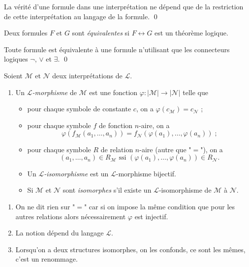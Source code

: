 \documentclass[./main]{subfiles}
\begin{document}
  \begin{crlr}
    La vérité d'une formule dans une interprétation ne dépend que de la restriction de cette interprétation au langage de la formule.
    \qed
  \end{crlr}

  \begin{defn}
    Deux formules $F$ et $G$ sont \textit{équivalentes} si $F \leftrightarrow G$ est un théorème logique.
  \end{defn}

  \begin{prop}
    Toute formule est équivalente à une formule n'utilisant que les connecteurs logiques $\lnot$, $\lor$ et $\exists$.
    \qed
  \end{prop}


  \begin{defn}
    Soient $\mathcal{M}$ et $\mathcal{N}$ deux interprétations de $\mathcal{L}$.
    \begin{enumerate}
      \item Un \textit{$\mathcal{L}$-morphisme} de $\mathcal{M}$ est une fonction $\varphi : |\mathcal{M}| \to |\mathcal{N}|$ telle que 
        \begin{itemize}
          \item pour chaque symbole de constante $c$, on a $\varphi(c_\mathcal{M}) = c_\mathcal{N}$ ;
          \item pour chaque symbole $f$ de fonction $n$-aire, on a 
            \[
            \varphi(f_\mathcal{M}(a_1, \ldots, a_n)) = f_\mathcal{N}(\varphi(a_1), \ldots, \varphi(a_n))\;
            ;\] 
          \item pour chaque symbole $R$ de relation $n$-aire (autre que "$=$"), on a 
            \[
              (a_1, \ldots, a_n) \in R_\mathcal{M} \text{ ssi } (\varphi(a_1), \ldots, \varphi(a_n)) \in R_\mathcal{N}
            .\]
          \item Un \textit{$\mathcal{L}$-isomorphisme} est un $\mathcal{L}$-morphisme bijectif.
          \item Si $\mathcal{M}$ et $\mathcal{N}$ sont \textit{isomorphes} s'il existe un $\mathcal{L}$-isomorphisme de $\mathcal{M}$ à $\mathcal{N}$.
        \end{itemize}
    \end{enumerate}
  \end{defn}

  \begin{rmk}
    \begin{enumerate}
      \item On ne dit rien sur "$=$" car si on impose la même condition que pour les autres relations alors nécessairement $\varphi$ est injectif.
      \item La notion dépend du langage $\mathcal{L}$.
      \item Lorsqu'on a deux structures isomorphes, on les confonds, ce sont les mêmes, c'est un renommage.
    \end{enumerate}
  \end{rmk}
\end{document}

